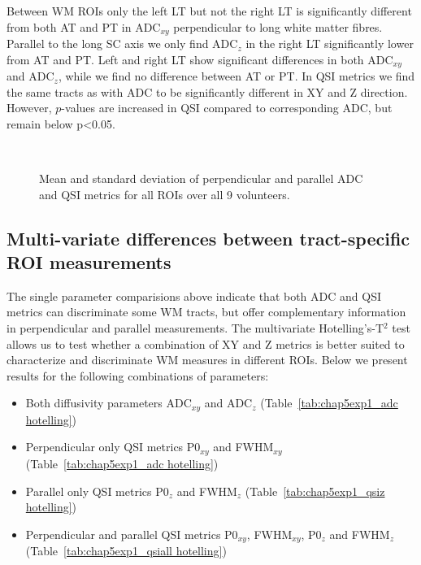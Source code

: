 Between \gls{WM} \glspl{ROI} only the left LT but not the right LT is significantly different from both AT and PT in ADC$_{xy}$ perpendicular to long white matter fibres. Parallel to the long \gls{SC} axis we only find ADC$_{z}$ in the right LT significantly lower from AT and PT. Left and right LT show significant differences in both ADC$_{xy}$ and ADC$_{z}$, while we find no difference between AT or PT. In \gls{QSI} metrics we find the same tracts as with ADC to be significantly different in XY and Z direction. However, $p$-values are increased in \gls{QSI} compared to corresponding ADC, but remain below p<0.05.%
\begin{figure}[h!tp]
	\\
   \caption{Mean and standard deviation of perpendicular and parallel ADC and QSI metrics for all ROIs over all 9 volunteers.}
   \label{fig:chapter5 exp1 vals}	
\end{figure}

\subsection{Multi-variate differences between tract-specific ROI measurements}
The single parameter comparisions above indicate that both \gls{ADC} and \gls{QSI} metrics can discriminate some WM tracts, but offer complementary information in perpendicular and parallel measurements. The multivariate Hotelling's-T$^2$ test allows us to test whether a combination of XY and Z metrics is better suited to characterize and discriminate \gls{WM} measures in different \glspl{ROI}. Below we present results for the following combinations of parameters:
\begin{itemize}
    \item Both diffusivity parameters ADC$_{xy}$ and ADC$_z$ (Table~\ref{tab:chap5exp1_adc hotelling})
    \item Perpendicular only \gls{QSI} metrics P0$_{xy}$ and FWHM$_{xy}$ (Table~\ref{tab:chap5exp1_adc hotelling})
    \item Parallel only \gls{QSI} metrics P0$_z$ and FWHM$_z$ (Table~\ref{tab:chap5exp1_qsiz hotelling})
    \item Perpendicular and parallel \gls{QSI} metrics P0$_{xy}$, FWHM$_{xy}$, P0$_z$ and FWHM$_z$ (Table~\ref{tab:chap5exp1_qsiall hotelling})
\end{itemize}


